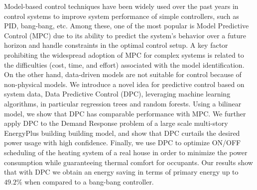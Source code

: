 Model-based control techniques have been widely used over the past years in control systems to improve system performance of simple controllers, such as PID, bang-bang, etc. Among these, one of the most popular is Model Predictive Control (MPC) due to its ability to predict the system's behavior over a future horizon and handle constraints in the optimal control setup. A key factor prohibiting the widespread adoption of MPC for complex systems is related to the difficulties (cost, time, and effort) associated with the model identification. On the other hand, data-driven models are not suitable for control because of non-physical models. We introduce a novel idea for predictive control based on system data, Data Predictive Control (DPC), leveraging machine learning algorithms, in particular regression trees and random forests. Using a bilinear model, we show that DPC has comparable performance with MPC. We further apply DPC to the Demand Response problem of a large scale multi-story EnergyPlus building building model, and show that DPC curtails the desired power usage with high confidence. Finally, we use DPC to optimize ON/OFF scheduling of the heating system of a real house in order to minimize the power consumption while guaranteeing thermal comfort for occupants. Our results show that with DPC we obtain an energy saving in terms of primary energy up to $49.2\%$ when compared to a bang-bang controller.